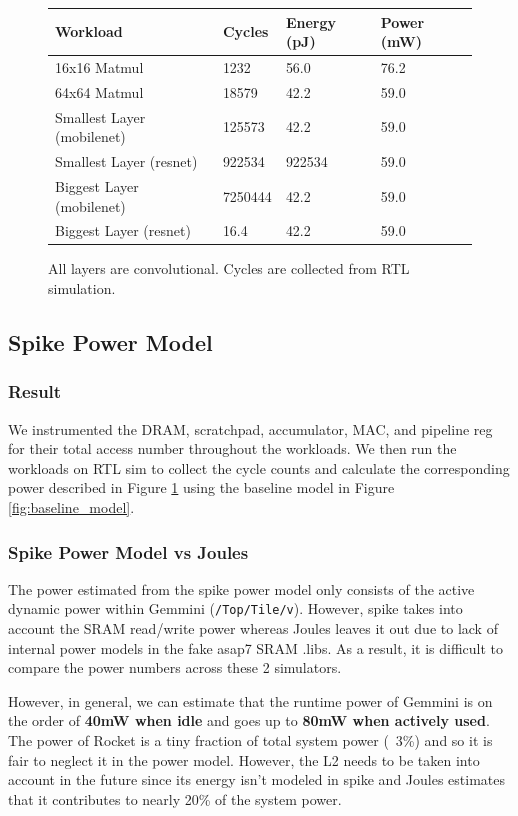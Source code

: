 \documentclass[sigconf]{acmart}
\begin{document}
\begin{figure}
  \begin{tabular}{ m{12em} | m{1cm}| m{1cm} | m{1cm} }
    \textbf{Workload} & \textbf{Cycles} & \textbf{Energy (pJ)} & \textbf{Power (mW)} \\ \toprule
    16x16 Matmul & 1232 & 56.0 & 76.2 \\ \midrule
    64x64 Matmul & 18579 & 42.2 & 59.0 \\ \midrule
    Smallest Layer (mobilenet) & 125573 & 42.2 & 59.0 \\ \midrule
    Smallest Layer (resnet) & 922534 & 922534 & 59.0 \\ \midrule
    Biggest Layer (mobilenet) & 7250444 & 42.2 & 59.0 \\ \midrule
    Biggest Layer (resnet) & 16.4 & 42.2 & 59.0 \\ \midrule
    \bottomrule
  \end{tabular}
  \caption{All layers are convolutional. Cycles are collected from RTL simulation.}
  \label{fig:spike_result}
\end{figure}

\subsection{Spike Power Model}
\subsubsection{Result}
We instrumented the DRAM, scratchpad, accumulator, MAC, and pipeline reg for their total access number throughout the workloads. We then run the workloads on RTL sim to collect the cycle counts and calculate the corresponding power described in Figure \ref{fig:spike_result} using the baseline model in Figure \ref{fig:baseline_model}.

\subsubsection{Spike Power Model vs Joules}
The power estimated from the spike power model only consists of the active dynamic power within Gemmini (\texttt{/Top/Tile/v}).
However, spike takes into account the SRAM read/write power whereas Joules leaves it out due to lack of internal power models in the fake asap7 SRAM .libs.
As a result, it is difficult to compare the power numbers across these 2 simulators.

However, in general, we can estimate that the runtime power of Gemmini is on the order of \textbf{40mW when idle} and goes up to \textbf{80mW when actively used}.
The power of Rocket is a tiny fraction of total system power (~3\%) and so it is fair to neglect it in the power model.
However, the L2 needs to be taken into account in the future since its energy isn't modeled in spike and Joules estimates that it contributes to nearly 20\% of the system power.
\end{document}
